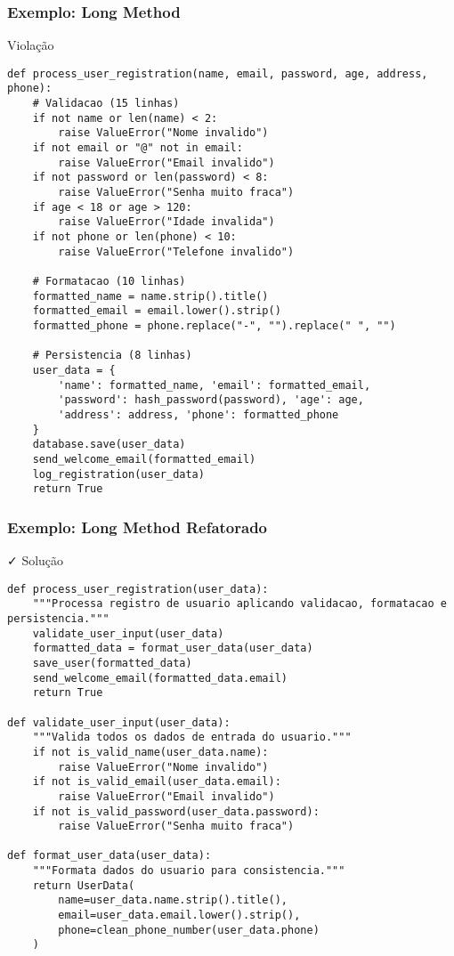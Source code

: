 \documentclass[aspectratio=169]{beamer}
\begin{document}
\begin{frame}[fragile]
\frametitle{Exemplo: Long Method}
\begin{block}{\textcolor{cleanred}{\faTimes} Violação}
\scriptsize
\begin{lstlisting}
def process_user_registration(name, email, password, age, address, phone):
    # Validacao (15 linhas)
    if not name or len(name) < 2:
        raise ValueError("Nome invalido")
    if not email or "@" not in email:
        raise ValueError("Email invalido") 
    if not password or len(password) < 8:
        raise ValueError("Senha muito fraca")
    if age < 18 or age > 120:
        raise ValueError("Idade invalida")
    if not phone or len(phone) < 10:
        raise ValueError("Telefone invalido")
    
    # Formatacao (10 linhas)
    formatted_name = name.strip().title()
    formatted_email = email.lower().strip()
    formatted_phone = phone.replace("-", "").replace(" ", "")
    
    # Persistencia (8 linhas)
    user_data = {
        'name': formatted_name, 'email': formatted_email,
        'password': hash_password(password), 'age': age,
        'address': address, 'phone': formatted_phone
    }
    database.save(user_data)
    send_welcome_email(formatted_email)
    log_registration(user_data)
    return True
\end{lstlisting}
\end{block}
\end{frame}

\begin{frame}[fragile]
\frametitle{Exemplo: Long Method Refatorado}
\begin{block}{\textcolor{cleangreen}{\faCheck} Solução}
\scriptsize
\begin{lstlisting}
def process_user_registration(user_data):
    """Processa registro de usuario aplicando validacao, formatacao e persistencia."""
    validate_user_input(user_data)
    formatted_data = format_user_data(user_data)
    save_user(formatted_data)
    send_welcome_email(formatted_data.email)
    return True

def validate_user_input(user_data):
    """Valida todos os dados de entrada do usuario."""
    if not is_valid_name(user_data.name):
        raise ValueError("Nome invalido")
    if not is_valid_email(user_data.email):
        raise ValueError("Email invalido")
    if not is_valid_password(user_data.password):
        raise ValueError("Senha muito fraca")

def format_user_data(user_data):
    """Formata dados do usuario para consistencia."""
    return UserData(
        name=user_data.name.strip().title(),
        email=user_data.email.lower().strip(),
        phone=clean_phone_number(user_data.phone)
    )
\end{lstlisting}
\end{block}
\end{frame}
\end{document}
